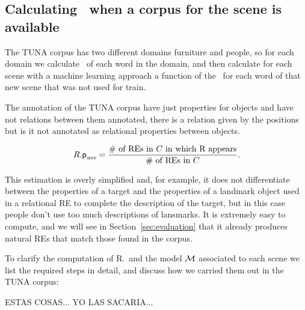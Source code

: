 \subsection{Calculating \puse\ when a corpus for the scene is available}

The TUNA corpus has two different domains furniture and people, so for each domain we calculate \puse\ of each word in the domain, and then calculate for each scene with a machine learning approach a function of the \puse\ for each word of that new scene that was not used for train. 

The annotation of the TUNA corpus have just properties for objects and have not relations between them annotated, there is a relation given by the positions but is it not annotated as relational properties between objects.

\begin{equation}\label{eq1}
R.\textsf{p}_\textit{use} = \frac{\# \mbox{ of REs in $C$ in which R appears}}{\# \mbox{ of REs in $C$}}.
\end{equation}

\noindent
This estimation is overly simplified and, for example, it does not differentiate between the properties of a target and the 
properties of a landmark object used in a relational RE to complete the description of the target, but in this case people don't use too much descriptions of lansmarks. It is extremely easy 
to compute, and we will see in Section~\ref{sec:evaluation} that it already produces natural REs that match those found in the corpus. 

To clarify the computation of R.\puse\ and the model $\mathcal{M}$ associated to each scene we list the required steps in detail, 
and discuss how we carried them out in the TUNA corpus:

ESTAS COSAS... YO LAS SACARIA...

